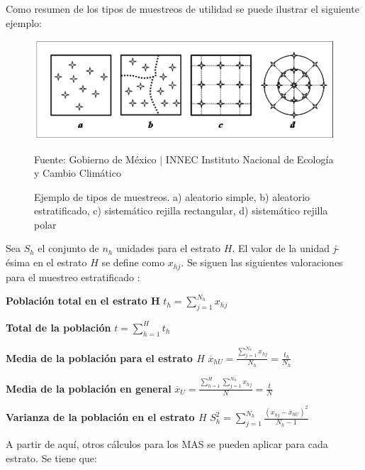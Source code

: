 \documentclass[conference]{IEEEtran}
\begin{document}
Como resumen de los tipos de muestreos de utilidad se puede ilustrar el siguiente ejemplo:

\begin{figure}[H]
    \centering
    \includegraphics[width=0.3\paperwidth]{ref/kind-of-samplings-example.png}
    \caption{Ejemplo de tipos de muestreos. a) aleatorio simple, b) aleatorio estratificado, c) sistemático rejilla rectangular, d) sistemático rejilla polar} \footnotesize
    Fuente: Gobierno de México $\mid$ INNEC Instituto Nacional de Ecología y Cambio Climático \cite{innec-2007}
\end{figure}

Sea $S_h$ el conjunto de $n_h$ unidades para el estrato $H$. El valor de la unidad \textit{j}-ésima en el estrato $H$ se define como $x_{hj}$. Se siguen las siguientes valoraciones para el muestreo estratificado \cite{lohr-2009}:

\bigbreak

\textbf{Población total en el estrato H}
\bigbreak
$t_h = \sum \limits_{j=1}^{N_h} x_{hj}$


\bigbreak

\textbf{Total de la población}
\bigbreak
$t = \sum \limits_{h=1}^H t_h$


\bigbreak

\textbf{Media de la población para el estrato $H$}
\bigbreak
$\overline{x}_{hU} = \frac{\sum \limits_{j=1}^{N_h} x_{hj}}{N_h} = \frac{t_h}{N_h}$


\bigbreak

\textbf{Media de la población en general}
\bigbreak
$\overline{x}_U = \frac{\sum \limits_{h=1}^H \sum \limits_{j=1}^{N_h} x_{hj}}{N} = \frac{t}{N}$


\bigbreak

\textbf{Varianza de la población en el estrato $H$}
\bigbreak
$S_h^2 = \sum \limits_{j=1}^{N_h} \frac{(x_{hj} - \overline{x}_{hU})^2}{N_h - 1}$


\bigbreak

A partir de aquí, otros cálculos para los MAS se pueden aplicar para cada estrato. Se tiene que:
\end{document}
